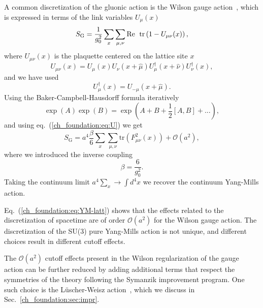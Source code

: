 A common discretization of the gluonic action is the Wilson gauge action~\citep{Wilson:1974sk}, which is expressed in terms of the link variables $U_{\mu}(x)$
\begin{equation}
\label{ch_foundation:eq:SG}
S_{\textrm{G}}=\frac{1}{g_0^2}\sum_x\sum_{\mu,\nu}{\textrm{Re\; tr}}\left(1-U_{\mu\nu}(x)\right),
\end{equation} 
where $U_{\mu\nu}(x)$ is the plaquette centered on the lattice site $x$
\begin{equation}
\label{ch_foundation:eq:plaq}
U_{\mu\nu}(x)=U_{\mu}(x)U_{\nu}(x+\hat{\mu})U_{\mu}^{\dagger}(x+\hat{\nu})U_{\nu}^{\dagger}(x),
\end{equation}
and we have used 
\begin{equation}
U_{\mu}^{\dagger}(x)=U_{-\mu}(x+\hat{\mu}).
\end{equation}
Using the Baker-Campbell-Hausdorff formula iteratively
\begin{equation}
\exp\left(A\right)\exp\left(B\right)=\exp\left(A+B+\frac{1}{2}\left[A,B\right]+...\right),
\end{equation}
and using eq.~(\ref{ch_foundation:eq:U}) we get
\begin{equation}
\label{ch_foundation:eq:YM-latt}
S_{\textrm{G}}=a^4\frac{\beta}{6}\sum_x\sum_{\mu,\nu}{\textrm{tr}}\left(F_{\mu\nu}^2(x)\right)+\mathcal{O}(a^2),
\end{equation}
where we introduced the inverse coupling
\begin{equation}
\beta=\frac{6}{g_0^2}.
\end{equation}
Taking the continuum limit $a^4\sum_x\rightarrow\int d^4x$ we recover the continuum Yang-Mills action.

Eq.~(\ref{ch_foundation:eq:YM-latt}) shows that the effects related to the discretization of spacetime are of order $\mathcal{O}(a^2)$ for the Wilson gauge action. The discretization of the SU(3) pure Yang-Mills action is not unique, and different choices result in different cutoff effects.

The $\mathcal{O}(a^2)$ cutoff effects present in the Wilson regularization of the gauge action can be further reduced by adding additional terms that respect the symmetries of the theory following the Symanzik improvement program. One such choice is the Lüscher-Weisz action~\citep{Luscher:1984xn}, which we discuss in Sec.~\ref{ch_foundation:sec:impr}.



